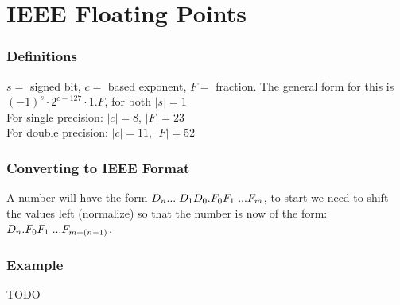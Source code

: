 \section{IEEE Floating Points}
\subsubsection*{Definitions}
$s = $ signed bit, $c =$ based exponent, $F =$ fraction. The general form
for this is $(-1)^s \cdot 2^{c - 127} \cdot 1.F$, for both $|s| = 1$\\
For single precision: $|c| = 8$, $|F| = 23$\\
For double precision: $|c| = 11$, $|F| = 52$\\

\subsubsection*{Converting to IEEE Format}
A number will have the form $D_n ... \hspace{1mm} D_1 D_0 . F_0 F_1 \hspace{1mm} ... F_m$,
to start we need to shift the values left (normalize) so that the number is now
of the form: $D_n . F_0 F_1 \hspace{1mm} ... F_{m + (n-1)}$.

\subsubsection*{Example}
TODO

